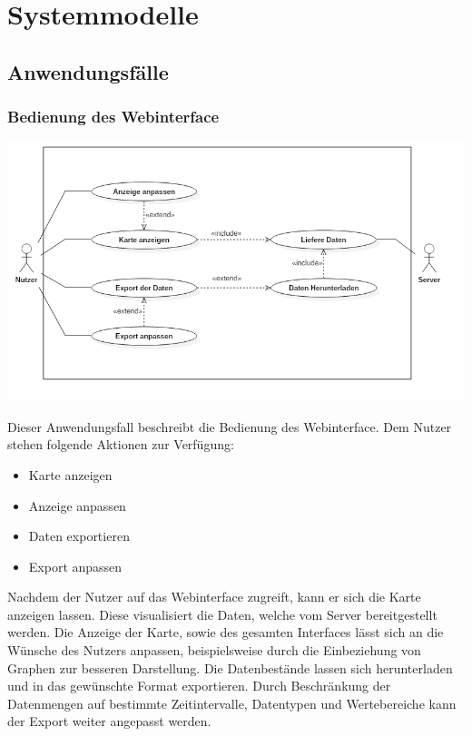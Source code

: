 \chapter{Systemmodelle}

\section{Anwendungsfälle}
    \subsection{Bedienung des Webinterface}
        \includegraphics[width=1\linewidth]{diagrams/UseCaseDiagram1.png}
       
       Dieser Anwendungsfall beschreibt die Bedienung des Webinterface. Dem Nutzer stehen folgende Aktionen zur Verfügung:
       \begin{itemize}
            \item Karte anzeigen
            \item Anzeige anpassen
            \item Daten exportieren
            \item Export anpassen
        \end{itemize}
        Nachdem der Nutzer auf das Webinterface zugreift, kann er sich die Karte anzeigen lassen. Diese visualisiert die Daten, welche 
        vom Server bereitgestellt werden. Die Anzeige der Karte, sowie des gesamten Interfaces lässt sich an die Wünsche des Nutzers 
        anpassen, beispielsweise durch die Einbeziehung von Graphen zur besseren Darstellung. Die Datenbestände lassen sich 
        herunterladen und in das gewünschte Format exportieren. Durch Beschränkung der Datenmengen auf bestimmte Zeitintervalle, 
        Datentypen und Wertebereiche kann der Export weiter angepasst werden.
        
